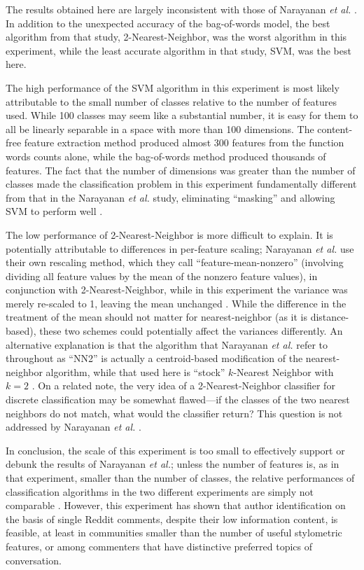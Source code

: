 \documentclass[12pt]{article}
\begin{document}
The results obtained here are largely inconsistent with those of Narayanan \textit{et al.} \cite{narayanan2012feasibility}. In addition to the unexpected accuracy of the bag-of-words model, the best algorithm from that study, 2-Nearest-Neighbor, was the worst algorithm in this experiment, while the least accurate algorithm in that study, SVM, was the best here.

The high performance of the SVM algorithm in this experiment is most likely attributable to the small number of classes relative to the number of features used. While 100 classes may seem like a substantial number, it is easy for them to all be linearly separable in a space with more than 100 dimensions. The content-free feature extraction method produced almost 300 features from the function words counts alone, while the bag-of-words method produced thousands of features. The fact that the number of dimensions was greater than the number of classes made the classification problem in this experiment fundamentally different from that in the Narayanan \textit{et al.} study, eliminating ``masking'' and allowing SVM to perform well \cite{narayanan2012feasibility}.

The low performance of 2-Nearest-Neighbor is more difficult to explain. It is potentially attributable to differences in per-feature scaling; Narayanan \textit{et al.} use their own rescaling method, which they call ``feature-mean-nonzero'' (involving dividing all feature values by the mean of the nonzero feature values), in conjunction with 2-Nearest-Neighbor, while in this experiment the variance was merely re-scaled to 1, leaving the mean unchanged \cite{narayanan2012feasibility}. While the difference in the treatment of the mean should not matter for nearest-neighbor (as it is distance-based), these two schemes could potentially affect the variances differently. An alternative explanation is that the algorithm that Narayanan \textit{et al.} refer to throughout as ``NN2'' is actually a centroid-based modification of the nearest-neighbor algorithm, while that used here is ``stock'' $k$-Nearest Neighbor with $k=2$ \cite{narayanan2012feasibility}. On a related note, the very idea of a 2-Nearest-Neighbor classifier for discrete classification may be somewhat flawed---if the classes of the two nearest neighbors do not match, what would the classifier return? This question is not addressed by Narayanan \textit{et al.} \cite{narayanan2012feasibility}.

In conclusion, the scale of this experiment is too small to effectively support or debunk the results of Narayanan \textit{et al.}; unless the number of features is, as in that experiment, smaller than the number of classes, the relative performances of classification algorithms in the two different experiments are simply not comparable \cite{narayanan2012feasibility}. However, this experiment has shown that author identification on the basis of single Reddit comments, despite their low information content, is feasible, at least in communities smaller than the number of useful stylometric features, or among commenters that have distinctive preferred topics of conversation.
\end{document}
